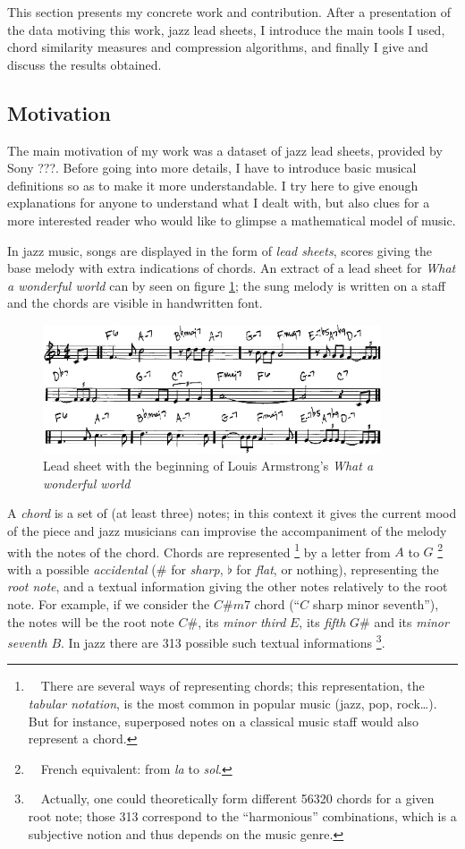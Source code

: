 \documentclass[a4paper,10pt]{article}
\newcommand{\guill}[1]{``#1''}
\begin{document}
This section presents my concrete work and contribution. After a presentation of the data motiving this work, jazz lead sheets, I introduce the main tools I used, chord similarity measures and compression algorithms, and finally I give and discuss the results obtained.

\subsection{Motivation}

The main motivation of my work was a dataset of jazz lead sheets, provided by Sony ???. Before going into more details, I have to introduce basic musical definitions so as to make it more understandable. I try here to give enough explanations for anyone to understand what I dealt with, but also clues for a more interested reader who would like to glimpse a mathematical model of music.

In jazz music, songs are displayed in the form of \emph{lead sheets}, scores giving the base melody with extra indications of chords. An extract of a lead sheet for \emph{What a wonderful world} can by seen on figure \ref{waww}; the sung melody is written on a staff and the chords are visible in handwritten font.

\begin{figure}
\centering
\includegraphics[width=10cm]{images/waww.jpg}
\caption{Lead sheet with the beginning of Louis Armstrong's \emph{What a wonderful world}\label{waww}}
\end{figure}

A \emph{chord} is a set of (at least three) notes; in this context it gives the current mood of the piece and jazz musicians can improvise the accompaniment of the melody with the notes of the chord. Chords are represented
\footnote{~~There are several ways of representing chords; this representation, the \emph{tabular notation}, is the most common in popular music (jazz, pop, rock\dots). But for instance, superposed notes on a classical music staff would also represent a chord.} 
by a letter from $A$ to $G$
\footnote{~~French equivalent: from \emph{la} to \emph{sol}.} 
with a possible \emph{accidental} ($\#$ for \emph{sharp}, $\flat$ for \emph{flat}, or nothing), representing the \emph{root note}, and a textual information giving the other notes relatively to the root note. For example, if we consider the $C\#m7$ chord (\guill{$C$ sharp minor seventh}), the notes will be the root note $C\#$, its \emph{minor third} $E$, its \emph{fifth} $G\#$ and its \emph{minor seventh} $B$. In jazz there are 313 possible such textual informations
\footnote{~~Actually, one could theoretically form different 56320 chords for a given root note; those 313 correspond to the \guill{harmonious} combinations, which is a subjective notion and thus depends on the music genre.}.
\end{document}

